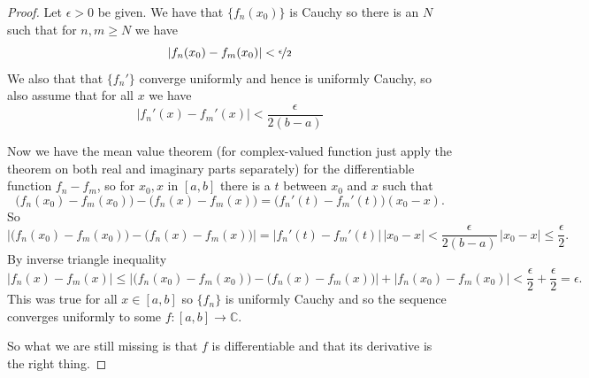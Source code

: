 \documentclass[12pt]{book}
\newcommand{\abs}[1]{\left\lvert {#1} \right\rvert}
\newcommand{\C}{{\mathbb{C}}}
\theoremstyle{plain}
\theoremstyle{remark}
\theoremstyle{definition}
\theoremstyle{exercise}
\theoremstyle{example}
\begin{document}
\begin{proof}
Let $\epsilon > 0$ be given.
We have that $\{ f_n(x_0) \}$ is Cauchy so there is an $N$ such that
for $n,m \geq N$ we have
\begin{equation*}
\abs{f_n(x_0)-f_m(x_0)} < \nicefrac{\epsilon}{2}
\end{equation*}
We also that that $\{ f_n' \}$ converge uniformly and hence is
uniformly Cauchy, so also assume that for all $x$ we have
\begin{equation*}
\abs{f_n'(x)-f_m'(x)} < \frac{\epsilon}{2(b-a)}
\end{equation*}

Now we have the mean value theorem (for complex-valued function just apply
the theorem on both real and imaginary parts separately)
for the differentiable function
$f_n-f_m$, so for $x_0, x$ in $[a,b]$ there is a $t$ between $x_0$ and $x$
such that
\begin{equation*}
\bigl(f_n(x_0)-f_m(x_0)\bigr)-\bigl(f_n(x)-f_m(x)\bigr) =
\bigl(f_n'(t)-f_m'(t)\bigr)(x_0-x) .
\end{equation*}
So
\begin{equation*}
\abs{\bigl(f_n(x_0)-f_m(x_0)\bigr)-\bigl(f_n(x)-f_m(x)\bigr)} =
\abs{f_n'(t)-f_m'(t)}\, \abs{x_0-x}
<
\frac{\epsilon}{2(b-a)}\, \abs{x_0-x}
\leq
\frac{\epsilon}{2} .
\end{equation*}
By inverse triangle inequality
\begin{equation*}
\abs{f_n(x)-f_m(x)} \leq
\abs{\bigl(f_n(x_0)-f_m(x_0)\bigr)-\bigl(f_n(x)-f_m(x)\bigr)} + 
\abs{f_n(x_0)-f_m(x_0)}
<
\frac{\epsilon}{2}
+
\frac{\epsilon}{2}
=\epsilon .
\end{equation*}
This was true for all $x \in [a,b]$ so
$\{f_n\}$ is uniformly Cauchy and so the sequence
converges uniformly to some $f \colon [a,b] \to \C$.

So what we are still missing is that $f$ is differentiable and 
that its derivative is the right thing.


\end{proof}
\end{document}
